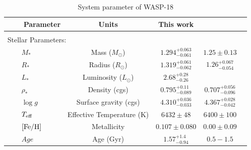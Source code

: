 \begin{table}
\caption{System parameter of WASP-18}
\label{wasp18}
\centering
\begin{tabular}{lcccc}
\hline \hline
~~~~Parameter & Units & This work & \cite{Hellier2009} & \cite{Shporer2018} \\
\hline
\smallskip\\\multicolumn{2}{l}{Stellar Parameters:}&\smallskip\\
~~~~$M_*$\dotfill &Mass (\(M_\odot\))\dotfill &$1.294^{+0.063}_{-0.061}$ & $1.25\pm0.13$ &  \\
~~~~$R_*$\dotfill &Radius (\(R_\odot\))\dotfill &$1.319^{+0.061}_{-0.062}$ &$1.26^{+0.067}_{-0.054}$ & \\
~~~~$L_*$\dotfill &Luminosity (\(L_\odot\))\dotfill &$2.68^{+0.28}_{-0.26}$ & &\\
~~~~$\rho_*$\dotfill &Density (cgs)\dotfill &$0.795^{+0.11}_{-0.089}$ & $ 0.707^{+0.056}_{-0.096}$&\\
~~~~$\log{g}$\dotfill & Surface gravity (cgs)\dotfill &$4.310^{+0.036}_{-0.033}$ &$4.367^{+0.028}_{-0.042}$ & \\
~~~~$T_{\rm eff}$\dotfill &Effective Temperature (K)\dotfill &$6432\pm48$ & $6400\pm100$& \\
~~~~$[{\rm Fe/H}]$\dotfill &Metallicity \dotfill &$0.107\pm0.080$ & $0.00\pm0.09$ & \\
~~~~$Age$\dotfill &Age (Gyr)\dotfill &$1.57^{+1.4}_{-0.94}$ & $0.5-1.5$ & \\


\end{tabular}
\end{table}
